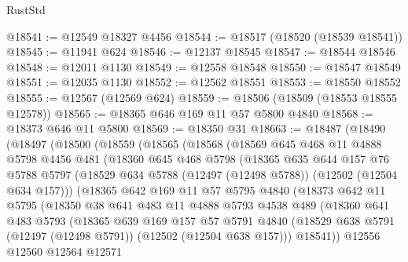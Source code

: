 \begin{lexlean}{RustStd}
\begin{coremodule}
@18541 := @12549 @18327 @4456
@18544 := @18517 (@18520 (@18539 @18541))
@18545 := @11941 @624
@18546 := @12137 @18545
@18547 := @18544 @18546
@18548 := @12011 @1130
@18549 := @12558 @18548
@18550 := @18547 @18549
@18551 := @12035 @1130
@18552 := @12562 @18551
@18553 := @18550 @18552
@18555 := @12567 (@12569 @624)
@18559 := @18506 (@18509 (@18553 @18555 @12578))
@18565 := @18365 @646 @169 @11 @57 @5800 @4840
@18568 := @18373 @646 @11 @5800
@18569 := @18350 @31
@18663 := @18487
    (@18490
      (@18497
        (@18500
          (@18559
            (@18565
              (@18568
                (@18569
                  @645
                  @468
                  @11
                  @4888
                  @5798
                  @4456
                  @481
                  (@18360
                    @645
                    @468
                    @5798
                    (@18365
                      @635
                      @644
                      @157
                      @76
                      @5788
                      @5797
                      (@18529 @634 @5788 (@12497 (@12498 @5788)) (@12502 (@12504 @634 @157)))
                      (@18365
                        @642
                        @169
                        @11
                        @57
                        @5795
                        @4840
                        (@18373
                          @642
                          @11
                          @5795
                          (@18350
                            @38
                            @641
                            @483
                            @11
                            @4888
                            @5793
                            @4538
                            @489
                            (@18360
                              @641
                              @483
                              @5793
                              (@18365
                                @639
                                @169
                                @157
                                @57
                                @5791
                                @4840
                                (@18529
                                  @638
                                  @5791
                                  (@12497 (@12498 @5791))
                                  (@12502 (@12504 @638 @157)))
                                @18541))
                            @12556
                            @12560
                            @12564
                            @12571

\end{coremodule}
\end{lexlean}
